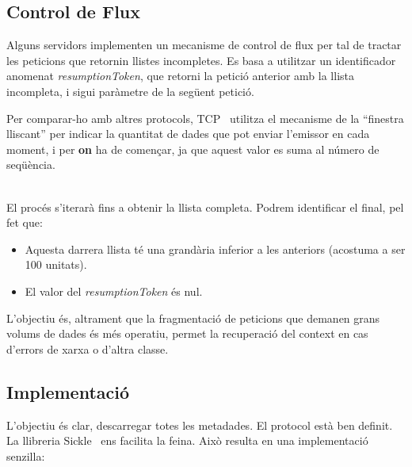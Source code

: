 \clearpage

\subsection{Control de Flux}\label{subsec:flux-control}

Alguns servidors implementen un mecanisme de control de flux per tal de tractar les peticions que retornin llistes incompletes.
Es basa a utilitzar un identificador anomenat \textit{resumptionToken}, que retorni la petició anterior amb la llista incompleta, i sigui paràmetre de la següent petició. \\

\begin{tcolorbox}[colback=blue!5!white, colframe=blue!75!black, title=Finestra lliscant]
    Per comparar-ho amb altres protocols, \gls{TCP}~\cite{tcp} utilitza el mecanisme de la ``finestra lliscant'' per indicar la quantitat de dades que pot enviar l'emissor en cada moment,
    i per \textbf{on} ha de començar, ja que aquest valor es suma al número de seqüència.
\end{tcolorbox}

\noindent \\
El procés s'iterarà fins a obtenir la llista completa.
Podrem identificar el final, pel fet que:

\begin{itemize}
    \item Aquesta darrera llista té una grandària inferior a les anteriors (acostuma a ser 100 unitats).
    \item El valor del \textit{resumptionToken} és nul. \\
\end{itemize}

\noindent
L'objectiu és, altrament que la fragmentació de peticions que demanen grans volums de dades és més operatiu,
permet la recuperació del context en cas d'errors de xarxa o d'altra classe.

\clearpage

\subsection{Implementació}\label{subsec:metadata-implemntation}

L'objectiu és clar, descarregar totes les metadades.
El protocol està ben definit.
La llibreria Sickle~\cite{Sickle} ens facilita la feina.
Això resulta en una implementació senzilla:

